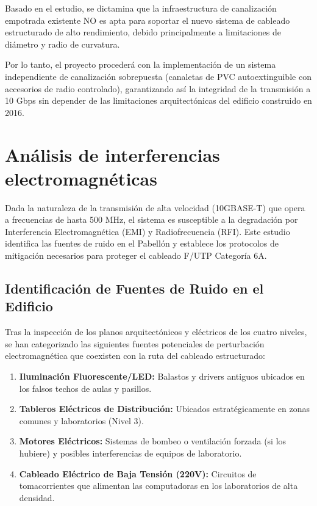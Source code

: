 Basado en el estudio, se dictamina que la infraestructura de canalización empotrada existente NO es apta para soportar el nuevo sistema de cableado estructurado de alto rendimiento, debido principalmente a limitaciones de diámetro y radio de curvatura.

Por lo tanto, el proyecto procederá con la implementación de un sistema independiente de canalización sobrepuesta (canaletas de PVC autoextinguible con accesorios de radio controlado), garantizando así la integridad de la transmisión a 10 Gbps sin depender de las limitaciones arquitectónicas del edificio construido en 2016.

\section{Análisis de interferencias electromagnéticas}

Dada la naturaleza de la transmisión de alta velocidad (10GBASE-T) que opera a frecuencias de hasta 500 MHz, el sistema es susceptible a la degradación por Interferencia Electromagnética (EMI) y Radiofrecuencia (RFI). Este estudio identifica las fuentes de ruido en el Pabellón y establece los protocolos de mitigación necesarios para proteger el cableado F/UTP Categoría 6A.

\subsection*{Identificación de Fuentes de Ruido en el Edificio}

Tras la inspección de los planos arquitectónicos y eléctricos de los cuatro niveles, se han categorizado las siguientes fuentes potenciales de perturbación electromagnética que coexisten con la ruta del cableado estructurado:

\begin{enumerate}
    \item \textbf{Iluminación Fluorescente/LED:} Balastos y drivers antiguos ubicados en los falsos techos de aulas y pasillos.
    \item \textbf{Tableros Eléctricos de Distribución:} Ubicados estratégicamente en zonas comunes y laboratorios (Nivel 3).
    \item \textbf{Motores Eléctricos:} Sistemas de bombeo o ventilación forzada (si los hubiere) y posibles interferencias de equipos de laboratorio.
    \item \textbf{Cableado Eléctrico de Baja Tensión (220V):} Circuitos de tomacorrientes que alimentan las computadoras en los laboratorios de alta densidad.
\end{enumerate}

